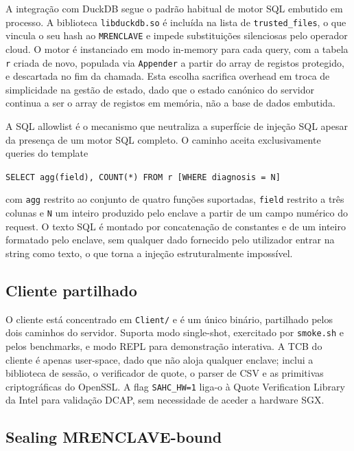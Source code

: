 A integração com DuckDB segue o padrão habitual de motor SQL embutido em processo. A biblioteca \texttt{libduckdb.so} é incluída na lista de \texttt{trusted\_files}, o que vincula o seu hash ao \texttt{MRENCLAVE} e impede substituições silenciosas pelo operador cloud. O motor é instanciado em modo in-memory para cada query, com a tabela \texttt{r} criada de novo, populada via \texttt{Appender} a partir do array de registos protegido, e descartada no fim da chamada. Esta escolha sacrifica overhead em troca de simplicidade na gestão de estado, dado que o estado canónico do servidor continua a ser o array de registos em memória, não a base de dados embutida.

A SQL allowlist é o mecanismo que neutraliza a superfície de injeção SQL apesar da presença de um motor SQL completo. O caminho aceita exclusivamente queries do template

\begin{center}
\texttt{SELECT agg(field), COUNT(*) FROM r [WHERE diagnosis = N]}
\end{center}

\noindent com \texttt{agg} restrito ao conjunto de quatro funções suportadas, \texttt{field} restrito a três colunas e \texttt{N} um inteiro produzido pelo enclave a partir de um campo numérico do request. O texto SQL é montado por concatenação de constantes e de um inteiro formatado pelo enclave, sem qualquer dado fornecido pelo utilizador entrar na string como texto, o que torna a injeção estruturalmente impossível.

\subsection{Cliente partilhado}

O cliente está concentrado em \texttt{Client/} e é um único binário, partilhado pelos dois caminhos do servidor. Suporta modo single-shot, exercitado por \texttt{smoke.sh} e pelos benchmarks, e modo REPL para demonstração interativa. A TCB do cliente é apenas user-space, dado que não aloja qualquer enclave; inclui a biblioteca de sessão, o verificador de quote, o parser de CSV e as primitivas criptográficas do OpenSSL. A flag \texttt{SAHC\_HW=1} liga-o à Quote Verification Library da Intel para validação DCAP, sem necessidade de aceder a hardware SGX.

\subsection{Sealing MRENCLAVE-bound}

